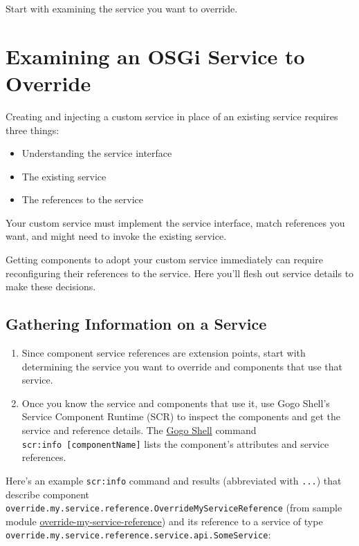 \noindent\hrulefill

Start with examining the service you want to override.

\chapter{Examining an OSGi Service to
Override}\label{examining-an-osgi-service-to-override}

Creating and injecting a custom service in place of an existing service
requires three things:

\begin{itemize}
\tightlist
\item
  Understanding the service interface
\item
  The existing service
\item
  The references to the service
\end{itemize}

Your custom service must implement the service interface, match
references you want, and might need to invoke the existing service.

Getting components to adopt your custom service immediately can require
reconfiguring their references to the service. Here you'll flesh out
service details to make these decisions.

\section{Gathering Information on a
Service}\label{gathering-information-on-a-service}

\begin{enumerate}
\def\labelenumi{\arabic{enumi}.}
\item
  Since component service references are extension points, start with
  determining the service you want to override and components that use
  that service.
\item
  Once you know the service and components that use it, use Gogo Shell's
  Service Component Runtime (SCR) to inspect the components and get the
  service and reference details. The
  \href{/docs/7-2/customization/-/knowledge_base/c/using-the-felix-gogo-shell}{Gogo
  Shell} command \texttt{scr:info\ {[}componentName{]}} lists the
  component's attributes and service references.
\end{enumerate}

Here's an example \texttt{scr:info} command and results (abbreviated
with \texttt{...}) that describe component
\texttt{override.my.service.reference.OverrideMyServiceReference} (from
sample module
\href{https://portal.liferay.dev/documents/113763090/114000186/override-my-service-reference.zip}{override-my-service-reference})
and its reference to a service of type
\texttt{override.my.service.reference.service.api.SomeService}:

